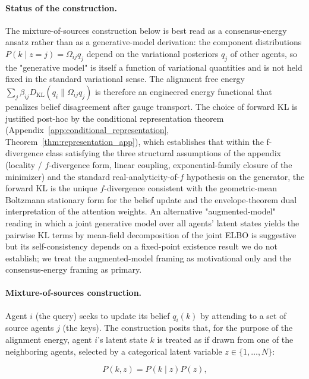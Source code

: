 \documentclass[11pt]{article}
\begin{document}
\paragraph{Status of the construction.} The mixture-of-sources construction below is best read as a consensus-energy ansatz rather than as a generative-model derivation: the component distributions $P(k \mid z{=}j) = \Omega_{ij}q_j$ depend on the variational posteriors $q_j$ of other agents, so the "generative model" is itself a function of variational quantities and is not held fixed in the standard variational sense. The alignment free energy $\sum_j \beta_{ij} D_{\mathrm{KL}}(q_i \| \Omega_{ij}q_j)$ is therefore an engineered energy functional that penalizes belief disagreement after gauge transport. The choice of forward KL is justified post-hoc by the conditional representation theorem (Appendix~\ref{app:conditional_representation}, Theorem~\ref{thm:representation_app}), which establishes that within the f-divergence class satisfying the three structural assumptions of the appendix (locality / $f$-divergence form, linear coupling, exponential-family closure of the minimizer) and the standard real-analyticity-of-$f$ hypothesis on the generator, the forward KL is the unique $f$-divergence consistent with the geometric-mean Boltzmann stationary form for the belief update and the envelope-theorem dual interpretation of the attention weights. An alternative "augmented-model" reading in which a joint generative model over all agents' latent states yields the pairwise KL terms by mean-field decomposition of the joint ELBO is suggestive but its self-consistency depends on a fixed-point existence result we do not establish; we treat the augmented-model framing as motivational only and the consensus-energy framing as primary.

\paragraph{Mixture-of-sources construction.}
Agent $i$ (the query) seeks to update its belief $q_i(k)$ by attending to a set of source agents $j$ (the keys). The construction posits that, for the purpose of the alignment energy, agent $i$'s latent state $k$ is treated as if drawn from one of the neighboring agents, selected by a categorical latent variable $z \in \{1, \ldots, N\}$:

\begin{equation}
P(k, z) = P(k \mid z) P(z),
\label{eq:mixture_joint}
\end{equation}
\end{document}
